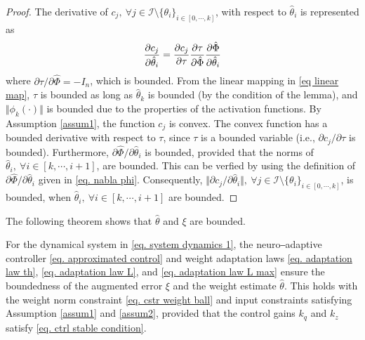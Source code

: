\documentclass[lettersize,journal]{IEEEtran}
\begin{document}
\begin{proof}

The derivative of $c_j,\ \forall j\in\mathcal I \setminus \{\theta_i\}_{i\in[0,\cdots,k]}$, with respect to $\hat\theta_i$ is represented as
\begin{equation}
    {\partial c_j\over\partial \hat\theta_i} = {\partial c_j\over\partial \tau} {\partial \tau\over\partial \hat\Phi} {\partial \hat\Phi\over\partial \hat\theta_i}
\end{equation}
where $\partial \tau/\partial \hat\Phi=-I_n$, which is bounded. From the linear mapping in \eqref{eq linear map}, $\tau$ is bounded as long as $\hat\theta_k$ is bounded (by the condition of the lemma), and $\Vert\phi_k(\cdot)\Vert$ is bounded due to the properties of the activation functions. By Assumption \ref{assum1}, the function $c_j$ is convex. The convex function has a bounded derivative with respect to $\tau$, since $\tau$ is a bounded variable (i.e., $\partial c_j/\partial\tau$ is bounded). Furthermore, $\partial \hat\Phi/\partial \hat\theta_i$ is bounded, provided that the norms of $\hat\theta_i,\ \forall i \in[k,\cdots,i+1]$, are bounded. This can be verfied by using the definition of $\partial \hat\Phi/\partial\hat\theta_i$ given in \eqref{eq. nabla phi}.
Consequently, $\Vert\partial c_j/\partial \hat\theta_i\Vert,\ \forall j\in\mathcal I \setminus \{\theta_i\}_{i\in[0,\cdots,k]}$, is bounded, when $\hat\theta_i,\ \forall i\in [k,\cdots,i+1]$ are bounded.

\end{proof}

The following theorem shows that $\hat\theta$ and $\xi$ are bounded.

\begin{theorem}
    For the dynamical system in \eqref{eq. system dynamics 1}, the neuro‒adaptive controller \eqref{eq. approximated control} and weight adaptation laws \eqref{eq. adaptation law th}, \eqref{eq. adaptation law L}, and \eqref{eq. adaptation law L max} ensure the boundedness of the augmented error $\xi$ and the weight estimate $\hat \theta$. This holds with the weight norm constraint \eqref{eq. cstr weight ball} and input constraints satisfying Assumption \ref{assum1} and \ref{assum2}, provided that the control gains ${k_q}$ and ${k_z}$ satisfy \eqref{eq. ctrl stable condition}.
\end{theorem}
\end{document}
